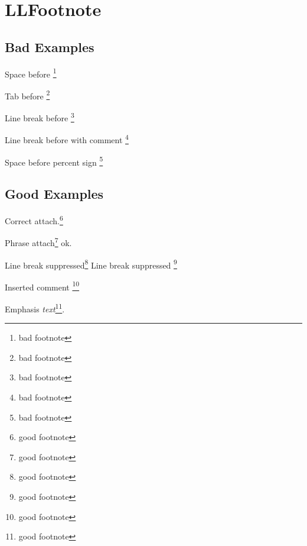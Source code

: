 \section{LLFootnote}

\subsection{Bad Examples}

Space before \footnote{bad footnote}

Tab before	\footnote{bad footnote}

Line break before
\footnote{bad footnote}

Line break before with comment
\footnote{bad footnote}

Space before percent sign %
\footnote{bad footnote}

\subsection{Good Examples}

Correct attach.\footnote{good footnote}

Phrase attach\footnote{good footnote} ok.

\begin{center}
	Line break suppressed\footnote{good footnote}
	Line break suppressed%
	\footnote{good footnote}
\end{center}

Inserted comment%
\footnote{good footnote}

Emphasis \emph{text}\footnote{good footnote}.
